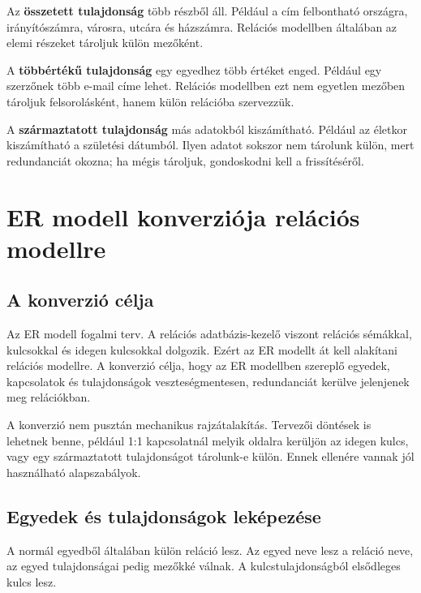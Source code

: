 Az \textbf{összetett tulajdonság} több részből áll. Például a cím felbontható országra, irányítószámra, városra, utcára és házszámra. Relációs modellben általában az elemi részeket tároljuk külön mezőként.

A \textbf{többértékű tulajdonság} egy egyedhez több értéket enged. Például egy szerzőnek több e-mail címe lehet. Relációs modellben ezt nem egyetlen mezőben tároljuk felsorolásként, hanem külön relációba szervezzük.

A \textbf{származtatott tulajdonság} más adatokból kiszámítható. Például az életkor kiszámítható a születési dátumból. Ilyen adatot sokszor nem tárolunk külön, mert redundanciát okozna; ha mégis tároljuk, gondoskodni kell a frissítéséről.

\section{ER modell konverziója relációs modellre}

\subsection{A konverzió célja}

Az ER modell fogalmi terv. A relációs adatbázis-kezelő viszont relációs sémákkal, kulcsokkal és idegen kulcsokkal dolgozik. Ezért az ER modellt át kell alakítani relációs modellre. A konverzió célja, hogy az ER modellben szereplő egyedek, kapcsolatok és tulajdonságok veszteségmentesen, redundanciát kerülve jelenjenek meg relációkban.

A konverzió nem pusztán mechanikus rajzátalakítás. Tervezői döntések is lehetnek benne, például 1:1 kapcsolatnál melyik oldalra kerüljön az idegen kulcs, vagy egy származtatott tulajdonságot tárolunk-e külön. Ennek ellenére vannak jól használható alapszabályok.

\begin{center}

\end{center}

\subsection{Egyedek és tulajdonságok leképezése}

A normál egyedből általában külön reláció lesz. Az egyed neve lesz a reláció neve, az egyed tulajdonságai pedig mezőkké válnak. A kulcstulajdonságból elsődleges kulcs lesz.

